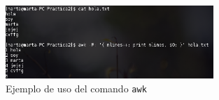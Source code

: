 \documentclass[10pt,a4paper,spanish]{article}
\numberwithin{equation}{section} %
\numberwithin{figure}{section} %
\numberwithin{table}{section} %
\begin{document}
\begin{figure}[!h]
    \centering
    \includegraphics[width=0.7\textwidth]{49}
    \caption{Ejemplo de uso del comando \texttt{awk}}
    \label{awkej}
\end{figure}

\end{document}
